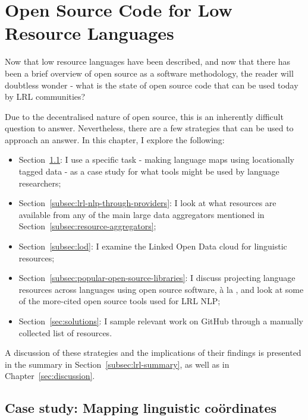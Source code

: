 \section{Open Source Code for Low Resource Languages}
\label{sec:lrl-code}

Now that low resource languages have been described, and now that there has been a brief overview of open source as a software methodology, the reader will doubtless wonder - what is the state of open source code that can be used today by LRL communities?

Due to the decentralised nature of open source, this is an inherently difficult question to answer. Nevertheless, there are a few strategies that can be used to approach an answer. In this chapter, I explore the following: 

\begin{itemize}
\item Section~\ref{subsec:mapping}: I use a specific task - making language maps using locationally tagged data -  as a case study for what tools might be used by language researchers;
\item Section~\ref{subsec:lrl-nlp-through-providers}: I look at what resources are available from any of the main large data aggregators mentioned in Section~\ref{subsec:resource-aggregators};
\item Section~\ref{subsec:lod}: I examine the Linked Open Data cloud for linguistic resources;
\item Section~\ref{subsec:popular-open-source-libraries}: I discuss projecting language resources across languages using open source software, \`a la \citet{bender2016linguistic}, and look at some of the more-cited open source tools used for LRL NLP;
\item Section~\ref{sec:solutions}: I sample relevant work on GitHub through a manually collected list of resources. 
\end{itemize}

A discussion of these strategies and the implications of their findings is presented in the summary in Section~\ref{subsec:lrl-summary}, as well as in Chapter~\ref{sec:discussion}.

\subsection{Case study: Mapping linguistic co\"ordinates}
\label{subsec:mapping}

